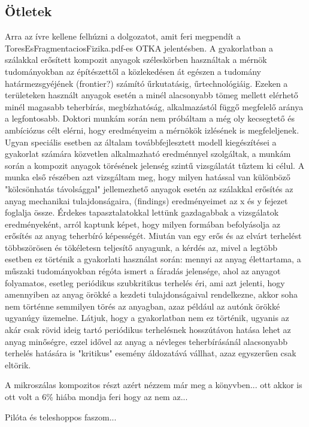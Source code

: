 \subsection{Ötletek}
Arra az ívre kellene felhúzni a dolgozatot, amit feri megpendít a ToresEsFragmentaciosFizika.pdf-es OTKA jelentésben.
A gyakorlatban a szálakkal erősített kompozit anyagok széleskörben használtak a mérnök tudományokban
az építészettől a közlekedésen át egészen a tudomány határmezsgyéjének (frontier?) számító űrkutatásig, űrtechnológiáig.
Ezeken a területeken használt anyagok esetén a minél alacsonyabb tömeg mellett elérhető minél
magasabb teherbírás, megbízhatóság, alkalmazástól függő megfelelő aránya a legfontosabb.
Doktori munkám során nem próbáltam a még oly kecsegtető és ambíciózus célt elérni, hogy eredményeim
a mérnökök izlésének is megfeleljenek. Ugyan speciális esetben az általam továbbfejlesztett
modell kiegészítései a gyakorlat számára közvetlen alkalmazható eredménnyel szolgáltak, a
munkám során a kompozit anyagok törésének jelenség szintű vizsgálatát tűztem ki célul.
A munka első részében azt vizsgáltam meg, hogy milyen hatással van különböző "kölcsönhatás
távolsággal" jellemezhető anyagok esetén az szálakkal erősítés az anyag mechanikai tulajdonságaira, (findings) eredményeimet az x és y fejezet foglalja össze. Érdekes tapasztalatokkal lettünk gazdagabbak a vizsgálatok eredményeként, arról kaptunk képet, hogy milyen formában befolyásolja az erősítés az anyag teherbíró képességét. Miután van egy erős és az elvárt terhelést
többszörösen és tökéletesn teljesítő anyagunk, a kérdés az, mivel a legtöbb esetben ez történik
a gyakorlati használat során: mennyi az anyag élettartama, a műszaki tudományokban régóta ismert
a fáradás jelensége, ahol az anyagot folyamatos, esetleg periódikus szubkritikus terhelés éri,
ami azt jelenti, hogy amennyiben az anyag örökké a kezdeti tulajdonságaival rendelkezne, akkor
soha nem történne semmilyen törés az anyagban, azaz például az autónk örökké ugyanúgy üzemelne.
Látjuk, hogy a gyakorlatban nem ez történik, ugyanis az akár csak rövid ideig tartó periódikus
terhelésnek hosszútávon hatása lehet az anyag minőségre, ezzel idővel az anyag a névleges
teherbírásánál alacsonyabb terhelés hatására is "kritikus" esemény áldozatává vállhat, azaz
egyszerűen csak eltörik.

A mikroszálas kompozitos részt azért nézzem már meg a könyvben... ott akkor is ott volt a 6\% hiába
mondja feri hogy az nem az...

Pilóta és teleshoppos faszom...







